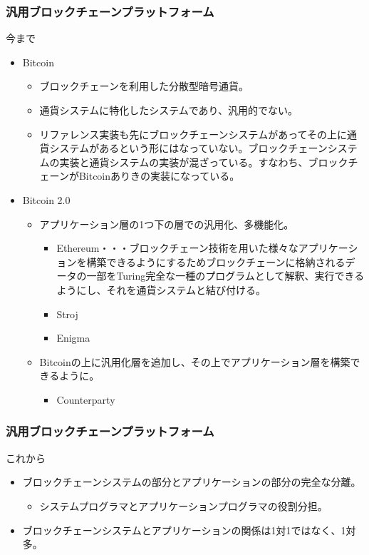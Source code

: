 \documentclass[dvipdfmx,9pt,notheorems]{beamer}
\theoremstyle{definition}
\begin{document}
\begin{frame}\frametitle{汎用ブロックチェーンプラットフォーム}
\begin{block}{今まで}
\begin{itemize}
 \item Bitcoin
 \begin{itemize}
  \item ブロックチェーンを利用した分散型暗号通貨。
  \item 通貨システムに特化したシステムであり、汎用的でない。
  \item リファレンス実装も先にブロックチェーンシステムがあってその上に通貨システムがあるという形にはなっていない。ブロックチェーンシステムの実装と通貨システムの実装が混ざっている。すなわち、ブロックチェーンがBitcoinありきの実装になっている。
 \end{itemize}
 \item Bitcoin 2.0
 \begin{itemize}
  \item アプリケーション層の1つ下の層での汎用化、多機能化。
  \begin{itemize}
   \item Ethereum・・・ブロックチェーン技術を用いた様々なアプリケーションを構築できるようにするためブロックチェーンに格納されるデータの一部をTuring完全な一種のプログラムとして解釈、実行できるようにし、それを通貨システムと結び付ける。
   \item Stroj
   \item Enigma
  \end{itemize}
  \item Bitcoinの上に汎用化層を追加し、その上でアプリケーション層を構築できるように。
  \begin{itemize}
   \item Counterparty
  \end{itemize}
 \end{itemize}
\end{itemize}
\end{block}
\end{frame}

\begin{frame}\frametitle{汎用ブロックチェーンプラットフォーム}
\begin{block}{これから}
\begin{itemize}
 \item ブロックチェーンシステムの部分とアプリケーションの部分の完全な分離。
 \begin{itemize}
  \item システムプログラマとアプリケーションプログラマの役割分担。
 \end{itemize}
 \item ブロックチェーンシステムとアプリケーションの関係は1対1ではなく、1対多。
\end{itemize}
\end{block}
\end{frame}
\end{document}
